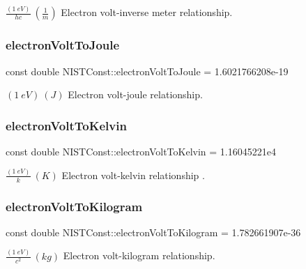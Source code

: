 $\frac{(1\ eV)}{hc} \ (\frac{1}{m})$ Electron volt-\/inverse meter relationship. \mbox{\label{group___electron_volt_ga51a94280936d8d7e92cbac054e1df485}} 
\subsubsection{\texorpdfstring{electron\+Volt\+To\+Joule}{electronVoltToJoule}}
{\footnotesize\ttfamily const double N\+I\+S\+T\+Const\+::electron\+Volt\+To\+Joule = 1.\+6021766208e-\/19}

$(1\ eV) \ (J)$ Electron volt-\/joule relationship. \mbox{\label{group___electron_volt_ga9cd0e681c5b9edabd2f1840c88d90176}} 
\subsubsection{\texorpdfstring{electron\+Volt\+To\+Kelvin}{electronVoltToKelvin}}
{\footnotesize\ttfamily const double N\+I\+S\+T\+Const\+::electron\+Volt\+To\+Kelvin = 1.\+16045221e4}

$\frac{(1\ eV)}{k} \ (K)$ Electron volt-\/kelvin relationship . \mbox{\label{group___electron_volt_ga21481a673cb040e04f7f8f95581ece0c}} 
\subsubsection{\texorpdfstring{electron\+Volt\+To\+Kilogram}{electronVoltToKilogram}}
{\footnotesize\ttfamily const double N\+I\+S\+T\+Const\+::electron\+Volt\+To\+Kilogram = 1.\+782661907e-\/36}

$\frac{(1\ eV)}{c^2} \ (kg)$ Electron volt-\/kilogram relationship. 